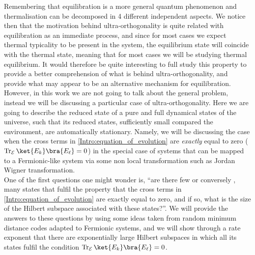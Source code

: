 \indent Remembering that equilibration is a more general quantum phenomenon and thermalisation can be  decomposed in 4 different independent aspects. We notice then that the motivation behind ultra-orthogonality is quite related with equilibration as an immediate process, and since for most cases we expect thermal typicality to be present in the system, the equilibrium state will coincide with the thermal state, meaning that for most cases we will be studying thermal equilibrium.
It would therefore be quite interesting to full study this property to provide a better comprehension of what is behind ultra-orthogonality, and provide what may appear to be an alternative mechanism for equilibration. However, in this work we are not going to talk about the general problem, instead we will be discussing a particular case of ultra-orthogonality. Here we are going to describe the reduced state of a pure and full dynamical states of the universe, such that its reduced states, sufficiently small compared the environment, are automatically stationary. Namely, we will be discussing the case when the cross terms in \eqref{Intro:equation_of_evolution} are \textit{exactly} equal to zero ($\operatorname{Tr}_{\mathcal{E}}\ket{E_k}\bra{E_\ell} = 0$) in the special case of systems that can be mapped to a Fermionic-like system via some non local transformation such as Jordan Wigner transformation\cite{reyes-lega_aspects_2016}.\\


\indent One of the first questions one might wonder is, ``are there few or conversely , many states that fulfil the property that the cross terms in \eqref{Intro:equation_of_evolution} are exactly equal to zero, and if so, what is the size of the Hilbert subspace associated with these states?''. We will provide the answers to these questions by using some ideas taken from random minimum distance codes adapted to Fermionic systems, and we will show through a rate exponent that there are exponentially large Hilbert subspaces in which all its states fulfil the condition $\operatorname{Tr}_{\mathcal{E}}\ket{E_k}\bra{E_\ell} = 0$.\\

